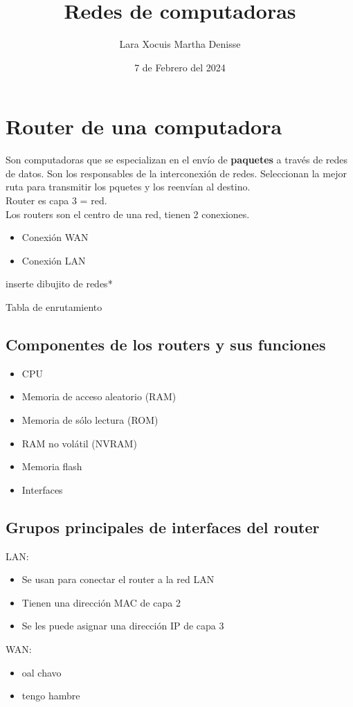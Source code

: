 \documentclass[letterpaper,12pt]{article}
\title {\textbf{Redes de computadoras}}
\author{Lara Xocuis Martha Denisse}
\date{7 de Febrero del 2024}
\begin{document}
\maketitle
\newpage
\begin{sloppypar}

\section{Router de una computadora}
Son computadoras que se especializan en el envío de \textbf{paquetes} a través de redes de datos. Son los responsables de la interconexión de redes. Seleccionan la mejor ruta para transmitir los pquetes y los reenvían al destino.
\vspace{0.3cm}\\ 
Router es capa 3 = red.
\vspace{0.3cm}\\
Los routers son el centro de una red, tienen 2 conexiones.
\begin{itemize}
    \item Conexión WAN 
    \item Conexión LAN
\end{itemize}

inserte dibujito de redes*

Tabla de enrutamiento

\subsection{Componentes de los routers y sus funciones} 
\begin{itemize}
    \item CPU 
    \item Memoria de acceso aleatorio (RAM)
    \item Memoria de sólo lectura (ROM)
    \item RAM no volátil (NVRAM)
    \item Memoria flash
    \item Interfaces
\end{itemize}

\subsection{Grupos principales de interfaces del router}
LAN:
\begin{itemize}
    \item Se usan para conectar el router a la red LAN 
    \item Tienen una dirección MAC de capa 2
    \item Se les puede asignar una dirección IP de capa 3
\end{itemize}
WAN:
\begin{itemize}
    \item oal chavo 
    \item tengo hambre
\end{itemize}


\end{sloppypar}
\end{document}
